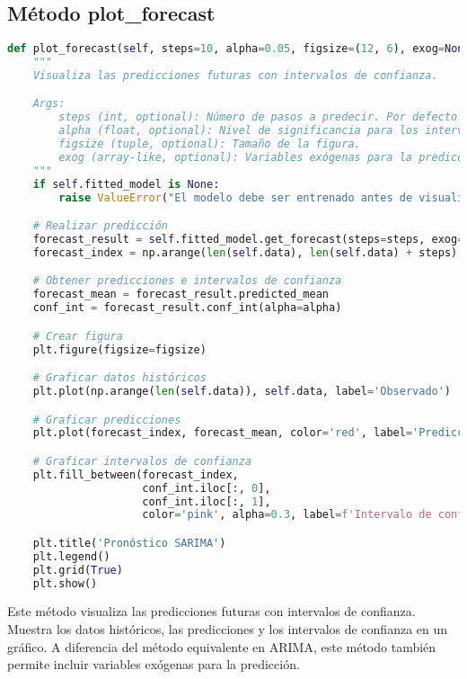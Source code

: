 \documentclass[12pt,letterpaper]{report}
\begin{document}
\subsection{Método plot\_forecast}
\begin{lstlisting}[language=python]
def plot_forecast(self, steps=10, alpha=0.05, figsize=(12, 6), exog=None):
    """
    Visualiza las predicciones futuras con intervalos de confianza.

    Args:
        steps (int, optional): Número de pasos a predecir. Por defecto es 10.
        alpha (float, optional): Nivel de significancia para los intervalos de confianza.
        figsize (tuple, optional): Tamaño de la figura.
        exog (array-like, optional): Variables exógenas para la predicción.
    """
    if self.fitted_model is None:
        raise ValueError("El modelo debe ser entrenado antes de visualizar predicciones")

    # Realizar predicción
    forecast_result = self.fitted_model.get_forecast(steps=steps, exog=exog)
    forecast_index = np.arange(len(self.data), len(self.data) + steps)

    # Obtener predicciones e intervalos de confianza
    forecast_mean = forecast_result.predicted_mean
    conf_int = forecast_result.conf_int(alpha=alpha)

    # Crear figura
    plt.figure(figsize=figsize)

    # Graficar datos históricos
    plt.plot(np.arange(len(self.data)), self.data, label='Observado')

    # Graficar predicciones
    plt.plot(forecast_index, forecast_mean, color='red', label='Predicción')

    # Graficar intervalos de confianza
    plt.fill_between(forecast_index,
                     conf_int.iloc[:, 0],
                     conf_int.iloc[:, 1],
                     color='pink', alpha=0.3, label=f'Intervalo de confianza {(1 - alpha) * 100}%')

    plt.title('Pronóstico SARIMA')
    plt.legend()
    plt.grid(True)
    plt.show()
\end{lstlisting}

Este método visualiza las predicciones futuras con intervalos de confianza. Muestra los datos históricos, las predicciones y los intervalos de confianza en un gráfico. A diferencia del método equivalente en ARIMA, este método también permite incluir variables exógenas para la predicción.
\end{document}
